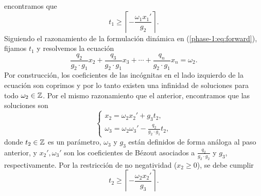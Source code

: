 encontramos que
\begin{equation*}
	t_1 \geq \left\lceil -\frac{\omega_1x_1'}{g_2} \right\rceil.
\end{equation*}
Siguiendo el razonamiento de la formulación dinámica en (\ref{phase-1:eq:forward}), fijamos $t_1$ y
resolvemos la ecuación
\begin{equation*}
	\frac{q_2}{g_2 \cdot g_1}x_2 +
	\frac{q_3}{g_2 \cdot g_1}x_3 +
	\cdots +
	\frac{q_n}{g_2 \cdot g_1}x_n
	= \omega_2.
\end{equation*}
Por construcción, los coeficientes de las incógnitas en el lado izquierdo de la ecuación son
coprimos y por lo tanto existen una infinidad de soluciones para todo $\omega_2 \in \mathbb{Z}$. Por el
mismo razonamiento que el anterior, encontramos que las soluciones son
\begin{equation*}
	\begin{cases}
		x_2 = \omega_2x_2' + g_3t_2, \\
		\omega_3 = \omega_2\omega_3' - \frac{q_2}{g_2 \cdot g_1}t_2,
	\end{cases}
\end{equation*}
donde $t_2 \in \mathbb{Z}$ es un parámetro, $\omega_3$ y $g_3$ están definidos de forma análoga al paso
anterior, y $x_2', \omega_3'$ son los coeficientes de Bézout asociados a $\frac{q_2}{g_2 \cdot g_2}$
y $g_3$, respectivamente. Por la restricción de no negatividad ($x_2 \geq 0$), se debe cumplir
\begin{equation*}
	t_2 \geq \left\lceil -\frac{\omega_2x_2'}{g_3} \right\rceil.
\end{equation*}

